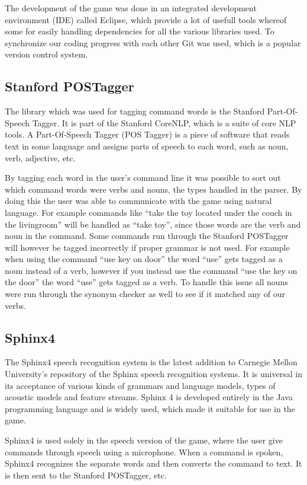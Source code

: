 The development of the game was done in an integrated development environment (IDE) called Eclipse, which provide a lot of usefull tools whereof some for easily handling dependencies for all the various libraries used. To synchronize our coding progress with each other Git was used, which is a popular version control system.

\subsection{Stanford POSTagger}
The library which was used for tagging command words is the Stanford Part-Of-Speech Tagger. It is part of the Stanford CoreNLP, which is a suite of core NLP tools. A Part-Of-Speech Tagger (POS Tagger) is a piece of software that reads text in some language and assigns parts of speech to each word, such as noun, verb, adjective, etc. \citep{POSTagger}

By tagging each word in the user's command line it was possible to sort out which command words were verbs and nouns, the types handled in the parser. By doing this the user was able to communicate with the game using natural language. For example commands like ``take the toy located under the couch in the livingroom'' will be handled as ``take toy'', since those words are the verb and noun in the command. Some commands run through the Stanford POSTagger will however be tagged incorrectly if proper grammar is not used. For example when using the command ``use key on door'' the word ``use'' gets tagged as a noun instead of a verb, however if you instead use the command ``use the key on the door'' the word ``use'' gets tagged as a verb. To handle this issue all nouns were run through the synonym checker as well to see if it matched any of our verbs.

\subsection{Sphinx4}
The Sphinx4 speech recognition system is the latest addition to Carnegie Mellon University's repository of the Sphinx speech recognition systems. It is universal in its acceptance of various kinds of grammars and language models, types of acoustic models and feature streams. Sphinx 4 is developed entirely in the Java programming language and is widely used, which made it suitable for use in the game. \citep{Sphinx4}

Sphinx4 is used solely in the speech version of the game, where the user give commands through speech using a microphone. When a command is spoken, Sphinx4 recognizes the separate words and then converts the command to text. It is then sent to the Stanford POSTagger, etc.


